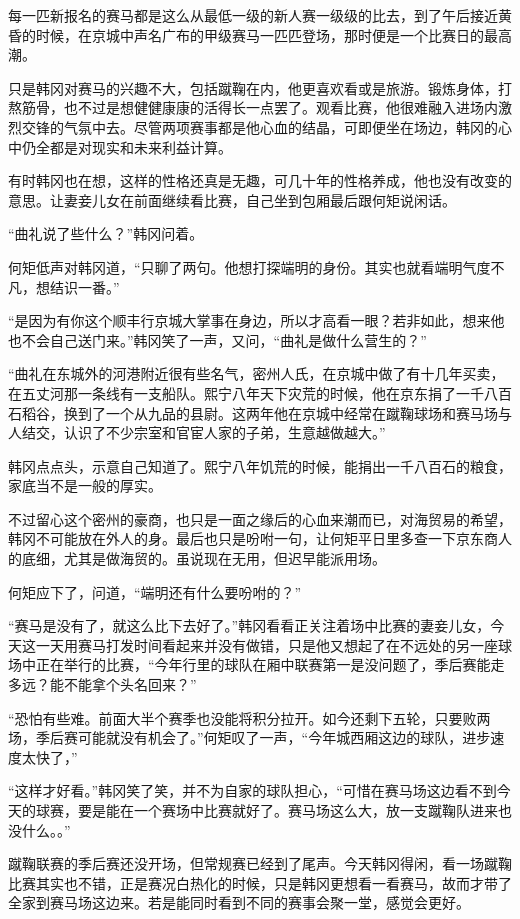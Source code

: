 每一匹新报名的赛马都是这么从最低一级的新人赛一级级的比去，到了午后接近黄昏的时候，在京城中声名广布的甲级赛马一匹匹登场，那时便是一个比赛日的最高潮。 

只是韩冈对赛马的兴趣不大，包括蹴鞠在内，他更喜欢看或是旅游。锻炼身体，打熬筋骨，也不过是想健健康康的活得长一点罢了。观看比赛，他很难融入进场内激烈交锋的气氛中去。尽管两项赛事都是他心血的结晶，可即便坐在场边，韩冈的心中仍全都是对现实和未来利益计算。 

有时韩冈也在想，这样的性格还真是无趣，可几十年的性格养成，他也没有改变的意思。让妻妾儿女在前面继续看比赛，自己坐到包厢最后跟何矩说闲话。 

“曲礼说了些什么？”韩冈问着。 

何矩低声对韩冈道，“只聊了两句。他想打探端明的身份。其实也就看端明气度不凡，想结识一番。” 

“是因为有你这个顺丰行京城大掌事在身边，所以才高看一眼？若非如此，想来他也不会自己送门来。”韩冈笑了一声，又问，“曲礼是做什么营生的？” 

“曲礼在东城外的河港附近很有些名气，密州人氏，在京城中做了有十几年买卖，在五丈河那一条线有一支船队。熙宁八年天下灾荒的时候，他在京东捐了一千八百石稻谷，换到了一个从九品的县尉。这两年他在京城中经常在蹴鞠球场和赛马场与人结交，认识了不少宗室和官宦人家的子弟，生意越做越大。” 

韩冈点点头，示意自己知道了。熙宁八年饥荒的时候，能捐出一千八百石的粮食，家底当不是一般的厚实。 

不过留心这个密州的豪商，也只是一面之缘后的心血来潮而已，对海贸易的希望，韩冈不可能放在外人的身。最后也只是吩咐一句，让何矩平日里多查一下京东商人的底细，尤其是做海贸的。虽说现在无用，但迟早能派用场。 

何矩应下了，问道，“端明还有什么要吩咐的？” 

“赛马是没有了，就这么比下去好了。”韩冈看看正关注着场中比赛的妻妾儿女，今天这一天用赛马打发时间看起来并没有做错，只是他又想起了在不远处的另一座球场中正在举行的比赛，“今年行里的球队在厢中联赛第一是没问题了，季后赛能走多远？能不能拿个头名回来？” 

“恐怕有些难。前面大半个赛季也没能将积分拉开。如今还剩下五轮，只要败两场，季后赛可能就没有机会了。”何矩叹了一声，“今年城西厢这边的球队，进步速度太快了，” 

“这样才好看。”韩冈笑了笑，并不为自家的球队担心，“可惜在赛马场这边看不到今天的球赛，要是能在一个赛场中比赛就好了。赛马场这么大，放一支蹴鞠队进来也没什么。。” 

蹴鞠联赛的季后赛还没开场，但常规赛已经到了尾声。今天韩冈得闲，看一场蹴鞠比赛其实也不错，正是赛况白热化的时候，只是韩冈更想看一看赛马，故而才带了全家到赛马场这边来。若是能同时看到不同的赛事会聚一堂，感觉会更好。 

